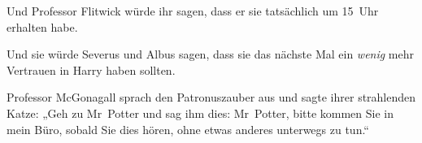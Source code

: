 Und Professor Flitwick würde ihr sagen, dass er sie tatsächlich um 15~Uhr erhalten habe.

Und sie würde Severus und Albus sagen, dass sie das nächste Mal ein \emph{wenig} mehr Vertrauen in Harry haben sollten.

Professor McGonagall sprach den Patronuszauber aus und sagte ihrer strahlenden Katze: „Geh zu Mr~Potter und sag ihm dies: Mr~Potter, bitte kommen Sie in mein Büro, sobald Sie dies hören, ohne etwas anderes unterwegs zu tun.“

